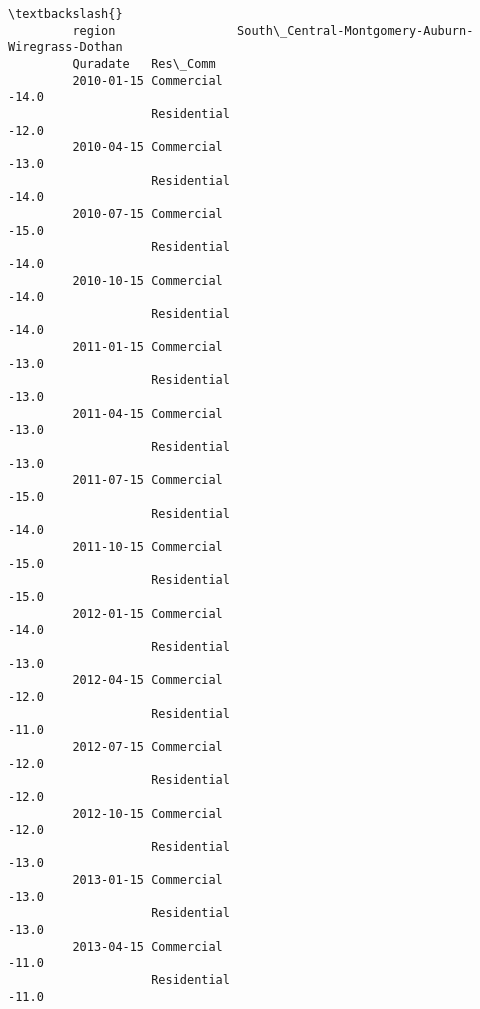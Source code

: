 \documentclass[11pt]{article}
\begin{document}
\begin{Verbatim}[commandchars=\\\{\}]
                                                                                  \textbackslash{}
         region                 South\_Central-Montgomery-Auburn-Wiregrass-Dothan   
         Quradate   Res\_Comm                                                       
         2010-01-15 Commercial                                             -14.0   
                    Residential                                            -12.0   
         2010-04-15 Commercial                                             -13.0   
                    Residential                                            -14.0   
         2010-07-15 Commercial                                             -15.0   
                    Residential                                            -14.0   
         2010-10-15 Commercial                                             -14.0   
                    Residential                                            -14.0   
         2011-01-15 Commercial                                             -13.0   
                    Residential                                            -13.0   
         2011-04-15 Commercial                                             -13.0   
                    Residential                                            -13.0   
         2011-07-15 Commercial                                             -15.0   
                    Residential                                            -14.0   
         2011-10-15 Commercial                                             -15.0   
                    Residential                                            -15.0   
         2012-01-15 Commercial                                             -14.0   
                    Residential                                            -13.0   
         2012-04-15 Commercial                                             -12.0   
                    Residential                                            -11.0   
         2012-07-15 Commercial                                             -12.0   
                    Residential                                            -12.0   
         2012-10-15 Commercial                                             -12.0   
                    Residential                                            -13.0   
         2013-01-15 Commercial                                             -13.0   
                    Residential                                            -13.0   
         2013-04-15 Commercial                                             -11.0   
                    Residential                                            -11.0   

\end{Verbatim}
\end{document}
